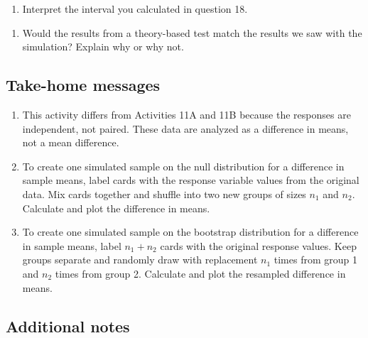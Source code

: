 \documentclass[
]{report}
\providecommand{\tightlist}{%
  \setlength{\itemsep}{0pt}\setlength{\parskip}{0pt}}
\begin{document}
\vspace{0.3in}

\begin{enumerate}
\def\labelenumi{\arabic{enumi}.}
\setcounter{enumi}{18}
\tightlist
\item
  Interpret the interval you calculated in question 18.
\end{enumerate}

\vspace{1in}

\begin{enumerate}
\def\labelenumi{\arabic{enumi}.}
\setcounter{enumi}{19}
\tightlist
\item
  Would the results from a theory-based test match the results we saw with the simulation? Explain why or why not.
\end{enumerate}

\vspace{1in}

\newpage

\hypertarget{take-home-messages-19}{%
\subsection{Take-home messages}\label{take-home-messages-19}}

\begin{enumerate}
\def\labelenumi{\arabic{enumi}.}
\item
  This activity differs from Activities 11A and 11B because the responses are independent, not paired. These data are analyzed as a difference in means, not a mean difference.
\item
  To create one simulated sample on the null distribution for a difference in sample means, label cards with the response variable values from the original data. Mix cards together and shuffle into two new groups of sizes \(n_1\) and \(n_2\). Calculate and plot the difference in means.
\item
  To create one simulated sample on the bootstrap distribution for a difference in sample means, label \(n_1 + n_2\) cards with the original response values. Keep groups separate and randomly draw with replacement \(n_1\) times from group 1 and \(n_2\) times from group 2. Calculate and plot the resampled difference in means.
\end{enumerate}

\hypertarget{additional-notes-18}{%
\subsection{Additional notes}\label{additional-notes-18}}
\end{document}
